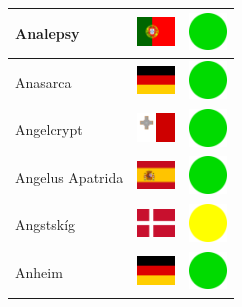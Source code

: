 \documentclass[12pt, a4paper, twoside]{report}
\begin{document}
\begin{center}
\begin{longtable}{|p{5cm}|p{2cm}|p{2cm}|}
 Analepsy                                                   & \includegraphics[width=1cm]{../4x3/pt} &   \includegraphics[width=1cm]{../likes/y} \\ \hline
 Anasarca                                                   & \includegraphics[width=1cm]{../4x3/de} &   \includegraphics[width=1cm]{../likes/y} \\ \hline
 Angelcrypt                                                 & \includegraphics[width=1cm]{../4x3/mt} &   \includegraphics[width=1cm]{../likes/y} \\ \hline
 Angelus Apatrida                                           & \includegraphics[width=1cm]{../4x3/es} &   \includegraphics[width=1cm]{../likes/y} \\ \hline
 Angstskíg                                                  & \includegraphics[width=1cm]{../4x3/dk} &   \includegraphics[width=1cm]{../likes/m} \\ \hline
 Anheim                                                     & \includegraphics[width=1cm]{../4x3/de} &   \includegraphics[width=1cm]{../likes/y} \\ \hline

\end{longtable}
\end{center}
\end{document}
